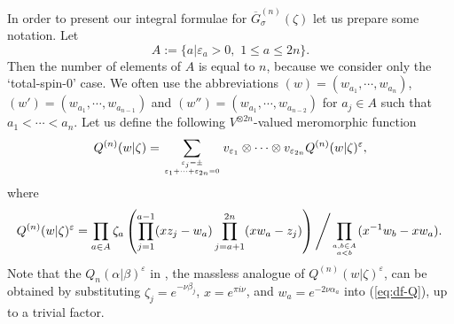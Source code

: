 \documentclass[a4paper,10pt]{article}
\begin{document}
In order to present our integral formulae for 
$\overline{G}_{\sigma}^{(n)}(\zeta )$ let us 
prepare some notation. Let 
\begin{equation}
A:=\{ a|\varepsilon_a >0, \,\,1\leqslant a\leqslant 2n \}. 
\label{eq:df-A}
\end{equation}
Then the number of elements of $A$ is equal to $n$, 
because we consider only the `total-spin-$0$' case. 
We often use the abbreviations 
$(w)=(w_{a_1}, \cdots , w_{a_n})$, 
$(w')=(w_{a_1}, \cdots , w_{a_{n-1}})$ and 
$(w'')=(w_{a_1}, \cdots , w_{a_{n-2}})$ for $a_j \in A$ 
such that $a_1 <\cdots <a_n$. Let us define the 
following $V^{\otimes 2n}$-valued meromorphic function 
\begin{equation}
Q^{(n)}(w|\zeta )=\sum_{\varepsilon_j =\pm\atop 
\varepsilon_1 +\cdots +\varepsilon_{2n}=0} 
v_{\varepsilon_1}\otimes \cdots \otimes 
v_{\varepsilon_{2n}} 
Q^{(n)}(w|\zeta )^{\varepsilon}, 
\label{eq:vec-Q}
\end{equation}
where 
\begin{equation}
Q^{(n)}(w|\zeta )^{\varepsilon} 
=\prod_{a\in A} \zeta_a \left( 
\prod_{j=1}^{a-1} (xz_j -w_a )
\prod_{j=a+1}^{2n} (xw_a -z_j ) \right) \left/ 
\prod_{a,b\in A\atop a<b} (x^{-1}w_b -xw_a ). \right.
\label{eq:df-Q}
\end{equation}
Note that the $Q_n (\alpha |\beta )^{\varepsilon}$ 
in \cite{massless-XXZ}, the massless analogue of 
$Q^{(n)}(w|\zeta )^{\varepsilon}$, can be obtained 
by substituting $\zeta_j =e^{-\nu \beta_j}$, 
$x=e^{\pi i\nu}$, and $w_a =e^{-2\nu \alpha_a}$ into 
(\ref{eq:df-Q}), up to a trivial factor. 
\end{document}
